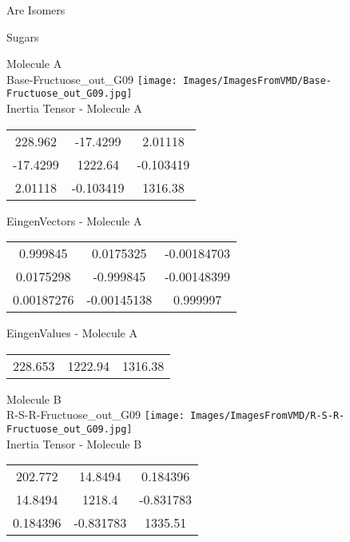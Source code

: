 \begin{center}
\vtab
\vtab
\textcolor{NavyBlue}{\Large Are Isomers}
\end{center}
\newpage

\vtab[-2cm]
\begin{center}
{\large Sugars}
\end{center}
\begin{multicols}{2}
\begin{center}
Molecule A \\ 
Base-Fructuose\_out\_G09
\texttt{[image: Images/ImagesFromVMD/Base-Fructuose\_out\_G09.jpg]}
\\
Inertia Tensor - Molecule A \\
\vtab
\begin{tabular}{|c c c|}
228.962	 & 	-17.4299	 & 	2.01118	 \\
-17.4299	 & 	1222.64	 & 	-0.103419	 \\
2.01118	 & 	-0.103419	 & 	1316.38
\end{tabular}

\vtab
 EingenVectors - Molecule A     \\
\vtab
\begin{tabular}{|c c c|}
0.999845	 & 	0.0175325	 & 	-0.00184703	 \\
0.0175298	 & 	-0.999845	 & 	-0.00148399	 \\
0.00187276	 & 	-0.00145138	 & 	0.999997
\end{tabular}

\vtab
 EingenValues - Molecule A     \\
\vtab
\begin{tabular}{|c c c|}
228.653	 & 	1222.94	 & 	1316.38
\end{tabular}
\columnbreak

Molecule B \\ 
R-S-R-Fructuose\_out\_G09
\texttt{[image: Images/ImagesFromVMD/R-S-R-Fructuose\_out\_G09.jpg]}
\\
Inertia Tensor - Molecule B \\
\vtab
\begin{tabular}{|c c c|}
202.772	 & 	14.8494	 & 	0.184396	 \\
14.8494	 & 	1218.4	 & 	-0.831783	 \\
0.184396	 & 	-0.831783	 & 	1335.51
\end{tabular}


\end{center}
\end{multicols}
